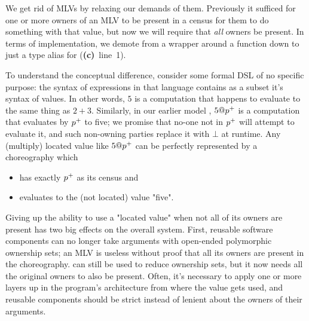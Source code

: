 We get rid of MLVs by relaxing our demands of them.
Previously it sufficed for one or more owners of an MLV to be present in a census for them to do something with that value,
but now we will require that \emph{all} owners be present.
In terms of implementation,
we demote  from a  wrapper around a function down to just a type alias for 
(\textbf{(c)}~line~1).

To understand the conceptual difference,
consider some formal DSL of no specific purpose:
the syntax of expressions in that language contains as a subset it's syntax of values.
In other words, $5$ is a computation that happens to evaluate to the same thing as $2+3$.
Similarly, in our earlier model \HLSCentral, $5@{p^{+}}$ is a computation that evaluates by ${p^{+}}$ to five;
we promise that no-one not in ${p^{+}}$ will attempt to evaluate it, and such non-owning parties replace it with $\bot$ at runtime.
Any (multiply) located value like $5@{p^{+}}$ can be perfectly represented by a choreography which
\begin{itemize}
	\item has exactly ${p^{+}}$ as its census and
	\item evaluates to the (not located) value "five".
\end{itemize}

Giving up the ability to use a "located value" when not all of its owners are present has two big effects on the overall system.
First, reusable software components can no longer take arguments with open-ended polymorphic ownership sets;
an MLV is useless without proof that all its owners are present in the choreography.
 can still be used to reduce ownership sets, but it now needs all the original owners to also be present.
Often, it's necessary to apply  one or more layers up in the program's architecture from where the value gets used,
and reusable components should be strict instead of lenient about the owners of their arguments.

